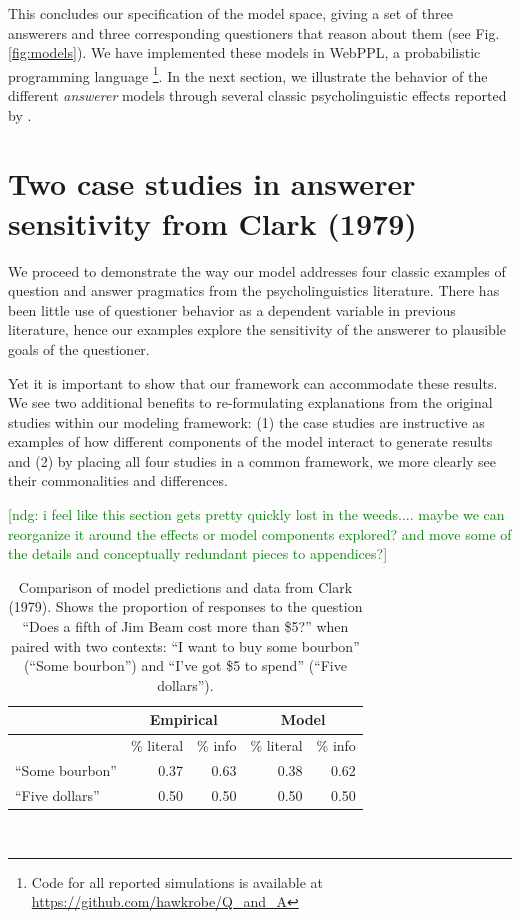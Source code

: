 \documentclass[12pt, floatsintext, jou]{apa6}
\newcommand{\ndg}[1]{\textcolor{Green}{[ndg: #1]}}
\begin{document}
This concludes our specification of the model space, giving a set of three answerers and three corresponding questioners that reason about them (see Fig. \ref{fig:models}). We have implemented these models in WebPPL, a probabilistic programming language \cite{GoodmanStuhlmuller14_DIPPL}\footnote{Code for all reported simulations is available at \url{https://github.com/hawkrobe/Q\_and\_A}}. 
In the next section, we illustrate the behavior of the different \emph{answerer} models through several classic psycholinguistic effects reported by .

\section{Two case studies in answerer sensitivity from Clark (1979)}

We proceed to demonstrate the way our model addresses four classic examples of question and answer pragmatics from the psycholinguistics literature. There has been little use of questioner behavior as a dependent variable in previous literature, hence our examples explore the sensitivity of the answerer to plausible goals of the questioner. 



Yet it is important to show that our framework can accommodate these results.
We see two additional benefits to re-formulating explanations from the original studies within our modeling framework: (1) the case studies are instructive as examples of how different components of the model interact to generate results and (2) by placing all four studies in a common framework, we more clearly see their commonalities and differences. 



\ndg{i feel like this section gets pretty quickly lost in the weeds.... maybe we can reorganize it around the effects or model components explored? and move some of the details and conceptually redundant pieces to appendices?}

\begin{table}[t]
\centering
\begin{tabular}{ p{3cm} | r | r ||||||  r | r }
& \multicolumn{2}{c||||||}{Empirical} & \multicolumn{2}{c}{Model} \\
\hline
&           \% literal &   \%  info &           \% literal &   \%  info    \\
\hline
``Some bourbon'' &   0.37 & 0.63 &  0.38 & 0.62 \\
\hline
``Five dollars''     & 0.50 & 0.50 & 0.50 & 0.50 \\
\end{tabular}
\\[1.5pt]
\caption{Comparison of model predictions and data from Clark (1979). Shows the proportion of responses to the question ``Does a fifth of Jim Beam cost more than \$5?'' when paired with two contexts: ``I want to buy some bourbon'' (``Some bourbon'') and ``I've got \$5 to spend'' (``Five dollars''). } 
\label{table:clark79exp4}
\end{table}
\end{document}

